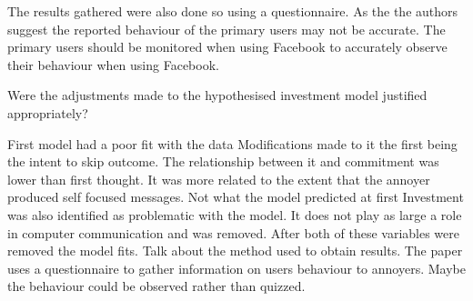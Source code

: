 \documentclass[12pt]{article}
\begin{document}
The results gathered were also done so using a questionnaire. As the the authors suggest the reported behaviour of the primary users may not be accurate. The primary users should be monitored when using Facebook to accurately observe their behaviour when using Facebook.

Were the adjustments made to the hypothesised investment model justified appropriately?

First model had a poor fit with the data
Modifications made to it the first being the intent to skip outcome. The relationship between it and commitment was lower than first thought. It was more related to the extent that the annoyer produced self focused messages. Not what the model predicted at first
Investment was also identified as problematic with the model. It does not play as large a role in computer communication and was removed.
After both of these variables were removed the model fits.
Talk about the method used to obtain results. The paper uses a questionnaire to gather information on users behaviour to annoyers. Maybe the behaviour could be observed rather than quizzed. 
\end{document}

